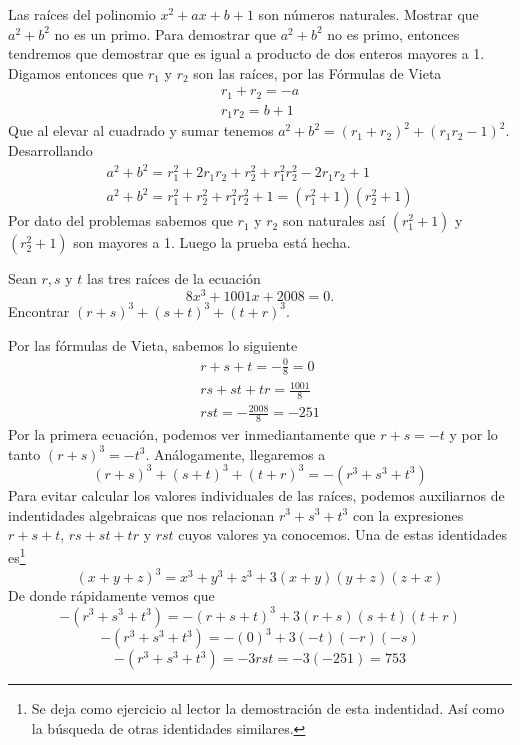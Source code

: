 {    \begin{example}[1986 URSS]
        Las raíces del polinomio $x^2 + ax + b + 1$ son números naturales. Mostrar que $a^2 + b^2$ no es un primo.
        \solution
        {
            Para demostrar que $a^2 + b^2$ no es primo, entonces tendremos que demostrar que es igual a producto de dos enteros mayores a 1.
            Digamos entonces que $r_1$ y $r_2$ son las raíces, por las Fórmulas de Vieta
            \begin{gather*}
                r_1 + r_2 = -a\\
                r_1 r_2 = b + 1
            \end{gather*}
            Que al elevar al cuadrado y sumar tenemos $a^2 + b^2 = (r_1 + r_2)^2 + (r_1 r_2 - 1)^2$. Desarrollando
            \begin{gather*}
                a^2 + b^2 = r^2_1 + 2r_1 r_2 + r^2_2 + r^2_1 r^2_2 - 2r_1 r_2 + 1 \\
                a^2 + b^2 = r^2_1 + r^2_2 + r^2_1 r^2_2+ 1 = \boxed{(r^2_1 + 1)(r^2_2 + 1)}
            \end{gather*}
            Por dato del problemas sabemos que $r_1$ y $r_2$ son naturales así $(r^2_1 + 1)$ y $(r^2_2 + 1)$ son mayores a 1.
            Luego la prueba está hecha.
        }
    \end{example}

    \begin{example}[2008 AIME II #7]
        Sean $r, s$ y $t$ las tres raíces de la ecuación
        \[8x^3 + 1001x + 2008 = 0.\]
        Encontrar $(r + s)^3 + (s + t)^3 + (t + r)^3.$

        \solution
        {
            Por las fórmulas de Vieta, sabemos lo siguiente
            \begin{gather*}
                r +  s + t = - \frac{0}{8} = 0 \\
                rs +  st + tr = \frac{1001}{8} \\
                r s t = - \frac{2008}{8} = -251
            \end{gather*}
            Por la primera ecuación, podemos ver inmediantamente que $r + s = -t$ y por lo tanto $(r + s)^3 = - t^3$.
            Análogamente, llegaremos a
            \[(r + s)^3 + (s + t)^3 + (t + r)^3 =  -(r^3 + s^3 + t^3)\]
            Para evitar calcular los valores individuales de las raíces, podemos auxiliarnos de indentidades algebraicas
            que nos relacionan $r^3 + s^3 + t^3$ con la expresiones $r +  s + t$, $rs +  st + tr$ y $rst$ cuyos valores ya conocemos.
            Una de estas identidades es\footnote{Se deja como ejercicio al lector la demostración de esta indentidad. Así como la búsqueda de otras identidades similares.}
            \[(x + y + z)^3 = x^3 + y^3 + z^3 + 3(x + y)(y + z)(z + x)\]
            De donde rápidamente vemos que
            \[-(r^3 + s^3 + t^3) = - (r + s + t)^3 + 3(r + s)(s + t)(t + r)\]
            \[-(r^3 + s^3 + t^3) = -(0)^3 + 3(-t)(-r)(-s)\]
            \[-(r^3 + s^3 + t^3) = - 3rst = -3(-251) = \boxed{753}\]
        }
    \end{example}

}\label{sec:desarrollo}

